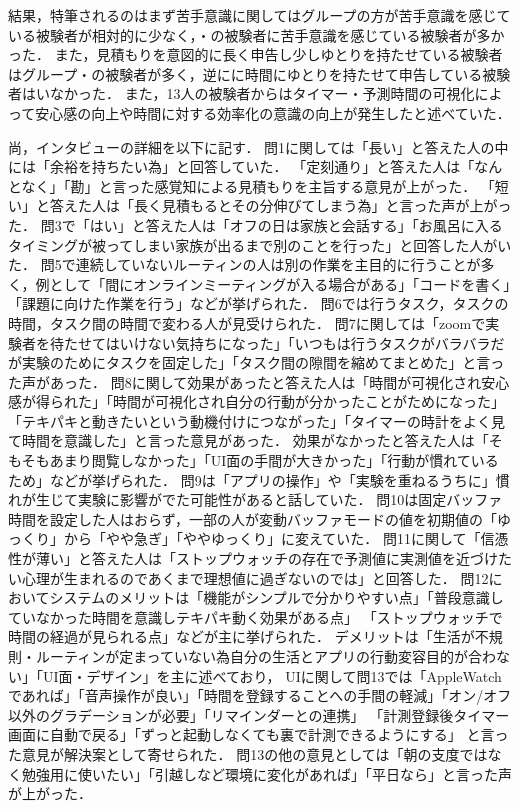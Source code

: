 結果，特筆されるのはまず苦手意識に関してはグループの方が苦手意識を感じている被験者が相対的に少なく，・の被験者に苦手意識を感じている被験者が多かった．
また，見積もりを意図的に長く申告し少しゆとりを持たせている被験者はグループ・の被験者が多く，逆にに時間にゆとりを持たせて申告している被験者はいなかった．
また，13人の被験者からはタイマー・予測時間の可視化によって安心感の向上や時間に対する効率化の意識の向上が発生したと述べていた．

尚，インタビューの詳細を以下に記す．
問1に関しては「長い」と答えた人の中には「余裕を持ちたい為」と回答していた．
「定刻通り」と答えた人は「なんとなく」「勘」と言った感覚知による見積もりを主旨する意見が上がった．
「短い」と答えた人は「長く見積もるとその分伸びてしまう為」と言った声が上がった．
問3で「はい」と答えた人は「オフの日は家族と会話する」「お風呂に入るタイミングが被ってしまい家族が出るまで別のことを行った」と回答した人がいた．
問5で連続していないルーティンの人は別の作業を主目的に行うことが多く，例として「間にオンラインミーティングが入る場合がある」「コードを書く」「課題に向けた作業を行う」などが挙げられた．
問6では行うタスク，タスクの時間，タスク間の時間で変わる人が見受けられた．
問7に関しては「zoomで実験者を待たせてはいけない気持ちになった」「いつもは行うタスクがバラバラだが実験のためにタスクを固定した」「タスク間の隙間を縮めてまとめた」と言った声があった．
問8に関して効果があったと答えた人は「時間が可視化され安心感が得られた」「時間が可視化され自分の行動が分かったことがためになった」
「テキパキと動きたいという動機付けにつながった」「タイマーの時計をよく見て時間を意識した」と言った意見があった．
効果がなかったと答えた人は「そもそもあまり閲覧しなかった」「UI面の手間が大きかった」「行動が慣れているため」などが挙げられた．
問9は「アプリの操作」や「実験を重ねるうちに」慣れが生じて実験に影響がでた可能性があると話していた．
問10は固定バッファ時間を設定した人はおらず，一部の人が変動バッファモードの値を初期値の「ゆっくり」から「やや急ぎ」「ややゆっくり」に変えていた．
問11に関して「信憑性が薄い」と答えた人は「ストップウォッチの存在で予測値に実測値を近づけたい心理が生まれるのであくまで理想値に過ぎないのでは」と回答した．
問12においてシステムのメリットは「機能がシンプルで分かりやすい点」「普段意識していなかった時間を意識しテキパキ動く効果がある点」
「ストップウォッチで時間の経過が見られる点」などが主に挙げられた．
デメリットは「生活が不規則・ルーティンが定まっていない為自分の生活とアプリの行動変容目的が合わない」「UI面・デザイン」を主に述べており，
UIに関して問13では「AppleWatchであれば」「音声操作が良い」「時間を登録することへの手間の軽減」「オン/オフ以外のグラデーションが必要」「リマインダーとの連携」
「計測登録後タイマー画面に自動で戻る」「ずっと起動しなくても裏で計測できるようにする」
と言った意見が解決案として寄せられた．
問13の他の意見としては「朝の支度ではなく勉強用に使いたい」「引越しなど環境に変化があれば」「平日なら」と言った声が上がった．

